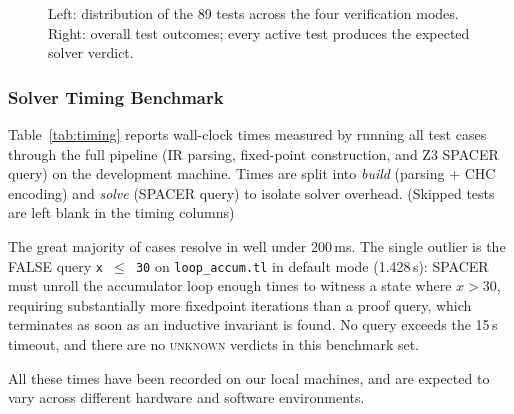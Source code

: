 \begin{figure}[H]
  \centering
  \begin{minipage}{0.45\textwidth}
    \centering
  \end{minipage}
  \begin{minipage}{0.45\textwidth}
    \centering
  \end{minipage}
  \caption{Left: distribution of the 89 tests across the four verification
           modes. Right: overall test outcomes; every active test produces
           the expected solver verdict.}
  \label{fig:pies}
\end{figure}

\subsubsection*{Solver Timing Benchmark}

Table~\ref{tab:timing} reports wall-clock times measured by running all test cases
through the full pipeline (IR parsing, fixed-point
construction, and Z3 SPACER query) on the development machine.
Times are split into \emph{build} (parsing + CHC encoding) and \emph{solve}
(SPACER query) to isolate solver overhead. (Skipped tests are left blank in the timing columns)

The great majority of cases resolve in well under 200\,ms.
The single outlier is the FALSE query \texttt{x~$\leq$~30} on
\texttt{loop\_accum.tl} in default mode (1.428\,s):
SPACER must unroll the accumulator loop enough times to witness a state
where $x > 30$, requiring substantially more fixedpoint iterations than a
proof query, which terminates as soon as an inductive invariant is found.
No query exceeds the 15\,s timeout, and there are no \textsc{unknown}
verdicts in this benchmark set.

All these times have been recorded on our local machines, and are expected to vary across different
hardware and software environments.

